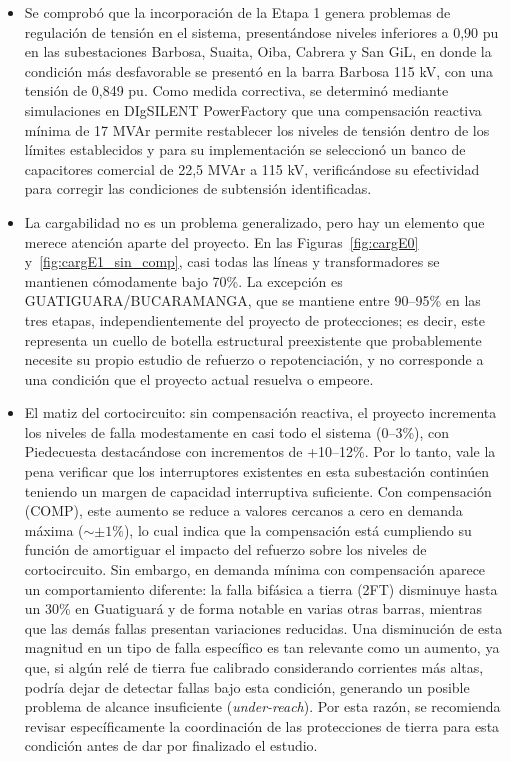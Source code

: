 \begin{itemize}
    \item Se comprobó que la incorporación de la Etapa 1 genera problemas de regulación de tensión en el sistema, presentándose niveles inferiores a 0,90 pu en las subestaciones Barbosa, Suaita, Oiba, Cabrera y San GiL, en donde la condición más desfavorable se presentó en la barra Barbosa 115 kV, con una tensión de 0,849 pu. Como medida correctiva, se determinó mediante simulaciones en DIgSILENT PowerFactory que una compensación reactiva mínima de 17 MVAr permite restablecer los niveles de tensión dentro de los límites establecidos y para su implementación se seleccionó un banco de capacitores comercial de 22,5 MVAr a 115 kV, verificándose su efectividad para corregir las condiciones de subtensión identificadas.
    \item La cargabilidad no es un problema generalizado, pero hay un elemento que merece atención aparte del proyecto. En las Figuras~\ref{fig:cargE0} y~\ref{fig:cargE1_sin_comp}, casi todas las líneas y transformadores se mantienen cómodamente bajo 70\%. La excepción es GUATIGUARA/BUCARAMANGA, que se mantiene entre 90--95\% en las tres etapas, independientemente del proyecto de protecciones; es decir, este representa un cuello de botella estructural preexistente que probablemente necesite su propio estudio de refuerzo o repotenciación, y no corresponde a una condición que el proyecto actual resuelva o empeore.
    \item El matiz del cortocircuito: sin compensación reactiva, el proyecto incrementa los niveles de falla modestamente en casi todo el sistema (0--3\%), con Piedecuesta destacándose con incrementos de +10--12\%. Por lo tanto, vale la pena verificar que los interruptores existentes en esta subestación continúen teniendo un margen de capacidad interruptiva suficiente. Con compensación (COMP), este aumento se reduce a valores cercanos a cero en demanda máxima ($\sim \pm 1\%$), lo cual indica que la compensación está cumpliendo su función de amortiguar el impacto del refuerzo sobre los niveles de cortocircuito. Sin embargo, en demanda mínima con compensación aparece un comportamiento diferente: la falla bifásica a tierra (2FT) disminuye hasta un 30\% en Guatiguará y de forma notable en varias otras barras, mientras que las demás fallas presentan variaciones reducidas. Una disminución de esta magnitud en un tipo de falla específico es tan relevante como un aumento, ya que, si algún relé de tierra fue calibrado considerando corrientes más altas, podría dejar de detectar fallas bajo esta condición, generando un posible problema de alcance insuficiente (\textit{under-reach}). Por esta razón, se recomienda revisar específicamente la coordinación de las protecciones de tierra para esta condición antes de dar por finalizado el estudio.

\end{itemize}





